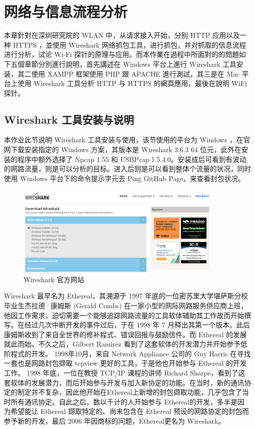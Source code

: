 \chapter{网络与信息流程分析}
\label{chap:1}

本章針對在深圳研究院的 WLAN 中，从请求接入开始，分别 HTTP 应用以及一种 HTTPS ，並使用 Wireshark 网络抓包工具，进行抓包，并对抓取的信息流程进行分析，试论 Wi-Fi 探针的原理与应用。而本作業在過程中所面對的的問題如下五個章節分別進行說明，首先講述在 Windows 平台上進行 Wireshark 工具安装，其二使用 XAMPP 框架使用 PHP 跟 APACHE 進行測試，其三是在 Mac 平台上使用 Wireshark 工具分析 HTTP 与 HTTPS 的網頁應用，最後在說明 WiFi 探针。


\section{Wireshark 工具安装与说明}

本作业此节说明 Wireshark 工具安装与使用，该节使用的平台为 Windows ，在官网下载安装指定的 Windows 方案，其版本是 Wireshark 3.6.3 64 位元，此外在安装的程序中额外选择了 Npcap 1.55 和 USBPcap 1.5.4.0。安装成后可看到有波动的网路流量，则是可以分析的目标。进入后则是可以看到整体个流量的状况，同时使用 Windows 平台下的命令提示字元去 Ping GitHub Page，来查看封包状况。

\begin{figure}[htb]
\centering 
\includegraphics[width=0.90\textwidth]{img/ch1s1m1.png} 
\caption{Wireshark 官方网站}
\label{Test}
\end{figure}

Wireshark 最早名为 Ethereal，其溯源于 1997 年底的一位密苏里大学堪萨斯分校毕业生杰拉德·康姆斯 (Gerald Combs) 在一家小型的网际网路服务供应商上班，他因工作需求，迫切需要一个能够追踪网路流量的工具软体辅助其工作故而开始撰写。在经过几次中断开发的事件过后，于在 1998 年 7 月释出其第一个版本。此后康姆斯收到了来自全世界的修补程式、错误回报与鼓励信件。而 Ethereal 的发展就此而始。不久之后，Gilbert Ramirez 看到了这套软体的开发潜力并开始参予低阶程式的开发。 1998年10月，来自 Network Appliance 公司的 Guy Harris 在寻找一套也是网路封包撷取 tcpview 更好的工具，于是他也开始参与 Ethereal 的开发工作。 1998 年底，一位在教授 TCP/IP 课程的讲师 Richard Sharpe，看到了这套软体的发展潜力，而后开始参与开发与加入新协定的功能。在当时，新的通讯协定的制定并不复杂，因此他开始在Ethereal上新增的封包撷取功能，几乎包含了当时所有通讯协定。自此之后，数以千计的人开始参与 Ethereal的开发，多半是因为希望能让 Ethereal 撷取特定的、尚未包含在 Ethereal 预设的网路协定的封包而参予新的开发，最后 2006 年因商标的问题，Ethereal更名为 Wireshark。

